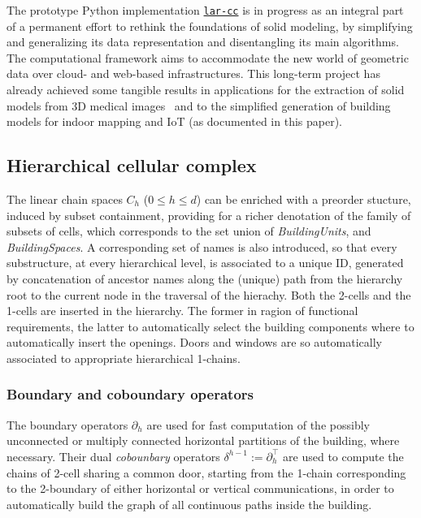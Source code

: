 \documentclass[]{egpubl}
\begin{document}
The prototype Python implementation \href{https://github.com/cvdlab/lar-cc}{\texttt{lar-cc}} is  in progress as an integral part of a permanent effort to rethink the foundations of solid modeling, by simplifying and generalizing its data representation and disentangling its main algorithms. The computational framework aims to accommodate the new world of geometric data over cloud- and web-based infrastructures. This long-term project has already achieved some tangible results in applications for the extraction of solid models from 3D medical images~\cite{paodcvjcadanda:2015} and to the simplified generation of building models for indoor mapping and IoT (as documented in this paper). 


\subsection{Hierarchical cellular complex}

The linear chain spaces $C_h$ ($0\leq h\leq d$) can be enriched with a preorder stucture, induced by subset containment, providing for a richer denotation of the family of subsets of cells, which  corresponds to the set union of \emph{BuildingUnits}, and \emph{BuildingSpaces}. A corresponding set of names is also introduced, so that every substructure, at every hierarchical level, is associated to a unique ID, generated by concatenation of ancestor names along the (unique) path from the hierarchy root to the current node in the traversal of the hierachy.  Both the 2-cells and the 1-cells are inserted in the hierarchy. The former in ragion of functional requirements, the latter to automatically select the building components where to automatically insert the openings. Doors and windows are so automatically associated to appropriate hierarchical 1-chains. 

\subsubsection*{Boundary and coboundary operators}

The boundary operators $\partial_h$ are used for fast computation of the possibly unconnected or multiply connected horizontal partitions of the building, where necessary. 
Their dual \emph{cobounbary} operators $\delta^{h-1} := \partial_h^\top$ are used to compute the chains of 2-cell sharing a common door, starting from the 1-chain corresponding to the 2-boundary of either horizontal or vertical communications, in order to automatically build the graph of all continuous paths inside the building.
\end{document}
